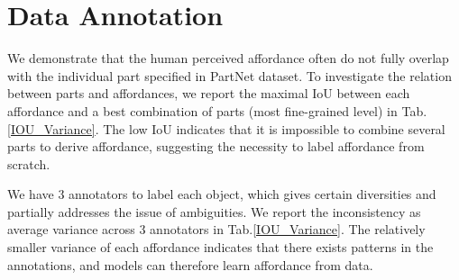 \documentclass[final]{cvpr}
\begin{document}
\section{Data Annotation}\label{sec:annotation}
\begin{table}[!htb]
\caption{IOU between each affordance and a best combination of parts. Variance of each affordance category. Numbers of IOU are in $\%$.}
\label{IOU_Variance}
\vspace{-0.4cm}
\end{table}
We demonstrate that the human perceived affordance often do not fully overlap with the individual part specified in PartNet dataset. To investigate the relation between parts and affordances, we report the maximal IoU between each affordance and a best combination of parts (most fine-grained level) in Tab.\ref{IOU_Variance}. The low IoU indicates that it is impossible to combine several parts to derive affordance, suggesting the necessity to label affordance from scratch.

{We have 3 annotators to label each object, which gives certain diversities and partially addresses the issue of ambiguities. We report the inconsistency as average variance across 3 annotators in Tab.\ref{IOU_Variance}. The relatively smaller variance of each affordance indicates that there exists patterns in the annotations, and models can therefore learn affordance from data.}
\end{document}
